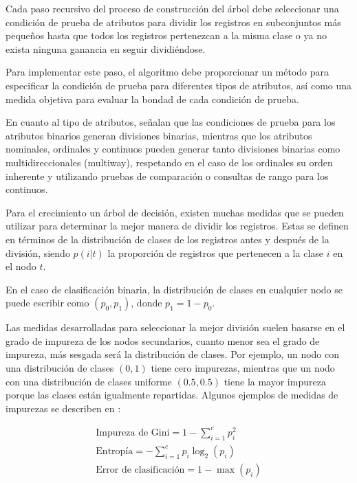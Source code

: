 Cada paso recursivo del proceso de construcción del árbol debe seleccionar una condición de prueba de atributos para dividir los registros en subconjuntos más pequeños hasta que todos los registros pertenezcan a la misma
clase o ya no exista ninguna ganancia en seguir dividiéndose.

Para implementar este paso, el algoritmo debe proporcionar un método para especificar la condición de prueba para
diferentes tipos de atributos, así como una medida objetiva para evaluar
la bondad de cada condición de prueba.

En cuanto al tipo de atributos, \citet{Steinbach2004DataMC} señalan que las condiciones de prueba para los atributos binarios generan divisiones binarias, mientras que los atributos nominales, ordinales y continuos pueden generar 
tanto divisiones binarias como multidireccionales (multiway), respetando en el caso de los ordinales su orden inherente y utilizando pruebas de comparación o consultas de rango para los continuos.

Para el crecimiento un árbol de decisión, existen muchas medidas que se pueden utilizar para determinar la mejor manera de dividir los registros. Estas se definen en términos 
de la distribución de clases de los registros antes y después de la división, siendo $p(i|t)$ la proporción de registros que pertenecen a la clase $i$ en el nodo $t$. 

En el caso de clasificación binaria, la distribución de 
clases en cualquier nodo se puede escribir como $(p_{0}, p_{1})$, donde $p_{1} = 1 − p_{0}$.

Las medidas desarrolladas para seleccionar la mejor división suelen basarse en el grado de impureza de los nodos secundarios, cuanto menor sea el grado de impureza, más sesgada será la 
distribución de clases. Por ejemplo, un nodo con una distribución de clases $(0, 1)$ tiene cero impurezas, mientras que un nodo con una distribución de clases uniforme $(0.5, 0.5)$ tiene la 
mayor impureza porque las clases están igualmente repartidas. Algunos ejemplos de medidas de impurezas se describen en \citet{Steinbach2004DataMC}:

\begin{subequations}
    \begin{gather}
        \text{Impureza de Gini} = 1 - \sum_{i=1}^{c} p_{i}^{2} \quad\\
        \text{Entropía} = -\sum_{i=1}^{c} p_{i} \log_{2}(p_{i}) \quad\\
        \text{Error de clasificación} = 1 - \max(p_{i})
    \end{gather}
\end{subequations}

